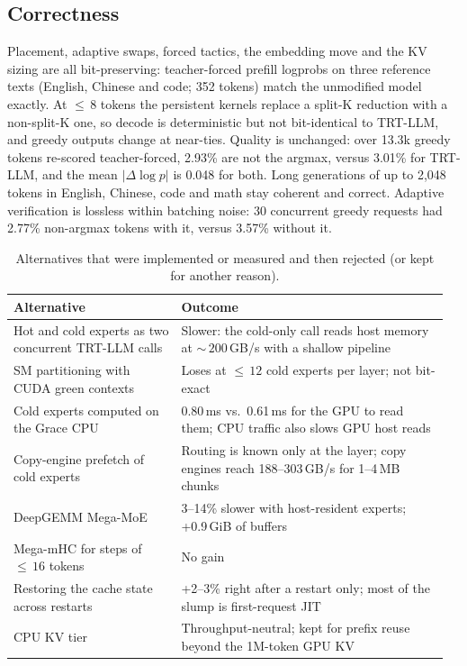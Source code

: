 \documentclass{article}
\begin{document}
\subsection{Correctness}
Placement, adaptive swaps, forced tactics, the embedding move and the KV sizing are all bit-preserving: teacher-forced
prefill logprobs on three reference texts (English, Chinese and code; 352 tokens) match the unmodified model exactly.
At ${\leq}\,8$ tokens the persistent kernels replace a split-K reduction with a non-split-K one, so decode is
deterministic but not bit-identical to TRT-LLM, and greedy outputs change at near-ties. Quality is unchanged: over 13.3k
greedy tokens re-scored teacher-forced, 2.93\% are not the argmax, versus 3.01\% for TRT-LLM, and the mean
$|\Delta\log p|$ is 0.048 for both. Long generations of up to 2,048 tokens in English, Chinese, code and math stay
coherent and correct. Adaptive verification is lossless within batching noise: 30 concurrent greedy requests had 2.77\%
non-argmax tokens with it, versus 3.57\% without it.

\begin{table}[tb]
\caption{Alternatives that were implemented or measured and then rejected (or kept for another reason).}\label{tab:rejected}
\centering\small\renewcommand{\arraystretch}{1.2}
\begin{tabular}{@{}L{0.37\linewidth}L{0.59\linewidth}@{}}
\toprule
Alternative & Outcome \\
\midrule
Hot and cold experts as two concurrent TRT-LLM calls & Slower: the cold-only call reads host memory at
  ${\sim}\,200$\,GB/s with a shallow pipeline \\
SM partitioning with CUDA green contexts & Loses at ${\leq}\,12$ cold experts per layer; not bit-exact \\
Cold experts computed on the Grace CPU & 0.80\,ms vs.\ 0.61\,ms for the GPU to read them; CPU traffic also slows GPU
  host reads \\
Copy-engine prefetch of cold experts & Routing is known only at the layer; copy engines reach 188--303\,GB/s for
  1--4\,MB chunks \\
DeepGEMM Mega-MoE \citep{deepgemm} & 3--14\% slower with host-resident experts; +0.9\,GiB of buffers \\
Mega-mHC for steps of ${\leq}\,16$ tokens & No gain \\
Restoring the cache state across restarts & +2--3\% right after a restart only; most of the slump is first-request
  JIT \\
CPU KV tier & Throughput-neutral; kept for prefix reuse beyond the 1M-token GPU KV \\
\bottomrule
\end{tabular}
\end{table}
\end{document}
